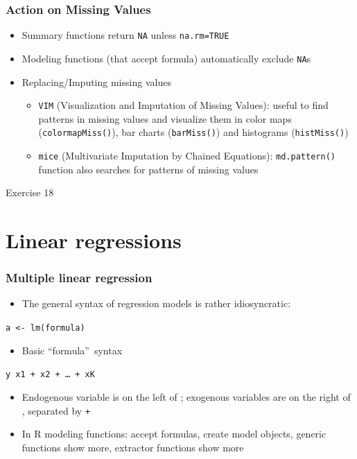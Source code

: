 \documentclass[xcolor={svgnames},10pt,
handout
]{beamer}
\begin{document}
\begin{frame}\frametitle{Action on Missing Values}
\begin{itemize}
\item Summary functions return \lstinline|NA| unless \lstinline|na.rm=TRUE|
\item Modeling functions (that accept formula) automatically exclude \lstinline|NA|s
\item Replacing/Imputing missing values
\begin{itemize}
\item \lstinline|VIM| (Visualization and Imputation of Missing Values): useful to find patterns in missing values and visualize them in color maps (\lstinline|colormapMiss()|), bar charts (\lstinline|barMiss()|) and histograms (\lstinline|histMiss()|)	
\item \lstinline|mice| (Multivariate Imputation by Chained Equations): \lstinline|md.pattern()| function also searches for patterns of missing values
\end{itemize}
\end{itemize}
\end{frame}

\begin{frame}[standout]
Exercise 18
\end{frame}

\section{Linear regressions}


\begin{frame}
\frametitle{Multiple linear regression}
\begin{itemize}
	\item The general syntax of regression models is rather idiosyncratic:
\end{itemize}
\begin{center}
	\texttt{a <- lm(formula)}
\end{center}
\begin{itemize}
	\item Basic \textquotedblleft formula\textquotedblright\ syntax
\end{itemize}
\begin{center}
	\texttt{y  x1 + x2 + \ldots\ + xK}
\end{center}
\begin{itemize}
	\item Endogenous variable is on the left of \texttt{}; exogenous
	variables are on the right of \texttt{}, separated by \texttt{+}
	\item In R modeling functions: accept formulas, create model objects, generic functions show more, extractor functions show more
	
\end{itemize}
\end{frame}
\end{document}
